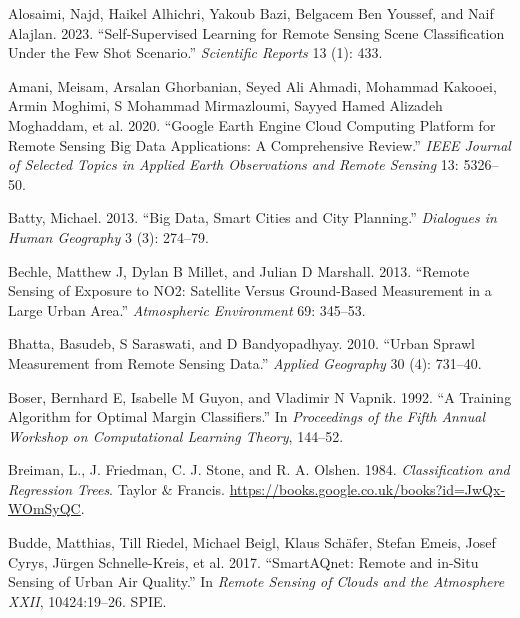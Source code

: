 \documentclass[
  letterpaper,
  DIV=11,
  numbers=noendperiod]{scrreprt}
\newlength{\cslhangindent}
\newlength{\cslentryspacingunit} %
\newenvironment{CSLReferences}[2] %
 {%
  \setlength{\parindent}{0pt}
  \ifodd #1
  \let\oldpar\par
  \def\par{\hangindent=\cslhangindent\oldpar}
  \fi
  \setlength{\parskip}{#2\cslentryspacingunit}
 }%
 {}
\begin{document}
\hypertarget{refs}{}
\begin{CSLReferences}{1}{0}
\leavevmode{}%
Alosaimi, Najd, Haikel Alhichri, Yakoub Bazi, Belgacem Ben Youssef, and
Naif Alajlan. 2023. {``Self-Supervised Learning for Remote Sensing Scene
Classification Under the Few Shot Scenario.''} \emph{Scientific Reports}
13 (1): 433.

\leavevmode{}%
Amani, Meisam, Arsalan Ghorbanian, Seyed Ali Ahmadi, Mohammad Kakooei,
Armin Moghimi, S Mohammad Mirmazloumi, Sayyed Hamed Alizadeh Moghaddam,
et al. 2020. {``Google Earth Engine Cloud Computing Platform for Remote
Sensing Big Data Applications: A Comprehensive Review.''} \emph{IEEE
Journal of Selected Topics in Applied Earth Observations and Remote
Sensing} 13: 5326--50.

\leavevmode{}%
Batty, Michael. 2013. {``Big Data, Smart Cities and City Planning.''}
\emph{Dialogues in Human Geography} 3 (3): 274--79.

\leavevmode{}%
Bechle, Matthew J, Dylan B Millet, and Julian D Marshall. 2013.
{``Remote Sensing of Exposure to NO2: Satellite Versus Ground-Based
Measurement in a Large Urban Area.''} \emph{Atmospheric Environment} 69:
345--53.

\leavevmode{}%
Bhatta, Basudeb, S Saraswati, and D Bandyopadhyay. 2010. {``Urban Sprawl
Measurement from Remote Sensing Data.''} \emph{Applied Geography} 30
(4): 731--40.

\leavevmode{}%
Boser, Bernhard E, Isabelle M Guyon, and Vladimir N Vapnik. 1992. {``A
Training Algorithm for Optimal Margin Classifiers.''} In
\emph{Proceedings of the Fifth Annual Workshop on Computational Learning
Theory}, 144--52.

\leavevmode{}%
Breiman, L., J. Friedman, C. J. Stone, and R. A. Olshen. 1984.
\emph{Classification and Regression Trees}. Taylor \& Francis.
\url{https://books.google.co.uk/books?id=JwQx-WOmSyQC}.

\leavevmode{}%
Budde, Matthias, Till Riedel, Michael Beigl, Klaus Schäfer, Stefan
Emeis, Josef Cyrys, Jürgen Schnelle-Kreis, et al. 2017. {``SmartAQnet:
Remote and in-Situ Sensing of Urban Air Quality.''} In \emph{Remote
Sensing of Clouds and the Atmosphere XXII}, 10424:19--26. SPIE.


\end{CSLReferences}
\end{document}
